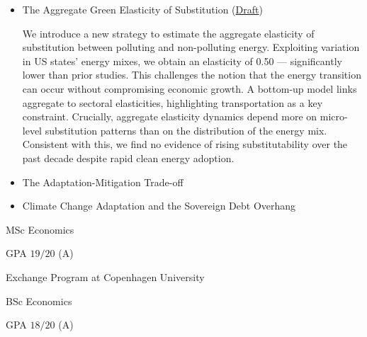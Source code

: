 \documentclass{practical-resume}
\begin{document}
	\begin{itemize}
	\item The Aggregate Green Elasticity of Substitution (\href{https://ruiagmsousa.github.io/research/agg-green-elasticity}{Draft})
		
	\begin{cvabstract}
We introduce a new strategy to estimate the aggregate elasticity of substitution between polluting and non-polluting energy. Exploiting variation in US states' energy mixes, we obtain an elasticity of 0.50 --- significantly lower than prior studies. This challenges the notion that the energy transition can occur without compromising economic growth. A bottom-up model links aggregate to sectoral elasticities, highlighting transportation as a key constraint. Crucially, aggregate elasticity dynamics depend more on micro-level substitution patterns than on the distribution of the energy mix. Consistent with this, we find no evidence of rising substitutability over the past decade despite rapid clean energy adoption.
	\end{cvabstract}

	\end{itemize}

	\begin{itemize}
		\item The Adaptation-Mitigation Trade-off
		\item Climate Change Adaptation and the Sovereign Debt Overhang
	\end{itemize}
	

	\begin{position}{MSc Economics}{}
		\item GPA $19/20$ (A)
		\item Exchange Program at Copenhagen University
	\end{position}

	\begin{position}{BSc Economics}{}
		\item GPA $18/20$ (A)
	\end{position}
\end{document}
